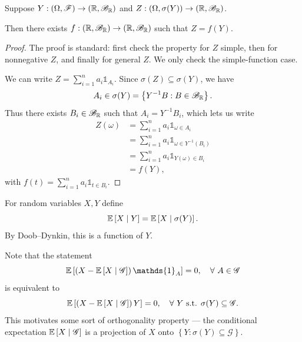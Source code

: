 \begin{lemma}
	Suppose $Y: \left( \Omega, \mathscr{F} \right)\to \left( \mathbb{R}, \mathscr{B}_{\mathbb{R}} \right)$ and $Z: \left( \Omega, \sigma(Y) \right)\to \left( \mathbb{R}, \mathscr{B}_{\mathbb{R}} \right)$.

	Then there exists $f: \left( \mathbb{R}, \mathscr{B}_{\mathbb{R}} \right) \to \left( \mathbb{R}, \mathscr{B}_{\mathbb{R}} \right)$ such that $Z = f(Y)$.
\end{lemma}
\begin{proof}
	The proof is standard: first check the property for $Z$ simple, then for nonnegative $Z$, and finally for general $Z$. We only check the simple-function case.

	We can write $Z = \sum_{i=1}^{n} a_i \mathds{1}_{A_i}$.
	Since $\sigma(Z) \subseteq  \sigma(Y)$, we have
	\[
		A_i \in \sigma(Y) = \left\{Y^{-1}B: B \in \mathscr{B}_{\mathbb{R}}\right\}.
	\]
	Thus there exists $B_i \in \mathscr{B}_{\mathbb{R}}$ such that $A_i = Y^{-1}B_i$, which lets us write
	\begin{align*}
		Z(\omega)
		&= \sum\limits_{i=1}^{n} a_i \mathds{1}_{\omega \in A_i}\\
		&= \sum\limits_{i=1}^{n} a_i \mathds{1}_{\omega \in Y^{-1}(B_i)}\\
		&= \sum\limits_{i=1}^{n} a_i \mathds{1}_{Y(\omega) \in B_i} \\
		&= f(Y)
	,\end{align*}
	with $f(t) = \sum_{i=1}^{n} a_i \mathds{1}_{t \in B_i}$.
\end{proof}

\begin{definition}
	For random variables $X,Y$ define \[
		\mathbb{E}\left[X \mid Y\right]  = \mathbb{E}\left[X \mid \sigma(Y)\right] 
	.\] By Doob--Dynkin, this is a function of $Y$.
\end{definition}

Note that the statement \[
	\E\left[\left( X - \E\left[X \mid \mathscr{G}\right]  \right)\mathds{1}_{A}\right] = 0, \quad \forall\  A \in \mathscr{G}
\] is equivalent to \[
	\mathbb{E}\left[\left( X - \mathbb{E}\left[X \mid \mathscr{G}\right]  \right)Y\right] =0, \quad \forall\  Y \text{ s.t. } \sigma(Y) \subseteq \mathscr{G}
.\] 
This motivates some sort of orthogonality property --- the conditional expectation $\mathbb{E}\left[X \mid \mathscr{G}\right] $ is a projection of $X$ onto $\left\{Y: \sigma(Y) \subseteq \mathscr{G}\right\}$.

